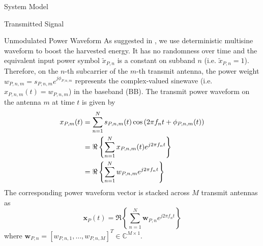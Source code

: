 \documentclass{IEEEtran}
\begin{document}
\begin{section} {System Model}
\begin{subsection}	{Transmitted Signal}
		\begin{subsubsection} {Unmodulated Power Waveform}
			As suggested in \cite{Clerckx2018b,Clerckx2016a}, we use deterministic multisine waveform to boost the harvested energy. It has no randomness over time and the equivalent input power symbol $\tilde{x}_{P,n}$ is a constant on subband $n$ (i.e. $\tilde{x}_{P,n} = 1$). Therefore, on the $n$-th subcarrier of the $m$-th transmit antenna, the power weight $w_{P,n,m} = s_{P,n,m} e^{j\phi_{P,n,m}}$ represents the complex-valued sinewave (i.e. $x_{P,n,m}(t) = w_{P,n,m}$) in the baseband (BB). The transmit power waveform on the antenna $m$ at time $t$ is given by
			\begin{equation}	\label{eq:x{P,m}(t)}
				\begin{split}
					x_{P,m}(t)
					&= \sum_{n=1}^{N} s_{P,n,m}(t) \cos \left( 2 \pi f_n t + \phi_{P,n,m}(t) \right)	\\
					&= \Re \left\{ \sum_{n=1}^{N} x_{P,n,m}(t) e^{j2 \pi f_n t} \right\}	\\
					&= \Re \left\{ \sum_{n=1}^{N} w_{P,n,m} e^{j2 \pi f_n t} \right\}
				\end{split}
			\end{equation}
			The corresponding power waveform vector is stacked across $M$ transmit antennas as
			\begin{equation}	\label{eq:x_P(t)}
				\boldsymbol{x}_P(t) = \Re \left\{ \sum_{n=1}^{N} \boldsymbol{w}_{P,n} e^{j2{\pi}{f_n}t} \right\}
			\end{equation}
			where $\boldsymbol{w}_{P,n}=[w_{P,n,1},\dots,w_{P,n,M}]^T \in \mathbb{C}^{M \times 1}$.
		\end{subsubsection}


\end{subsection}
\end{section}
\end{document}
